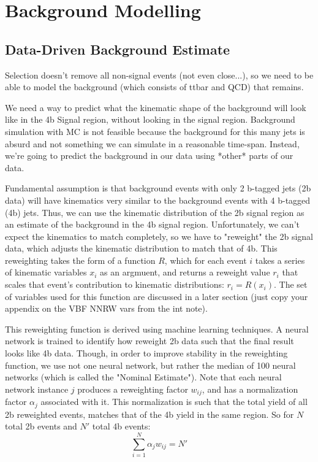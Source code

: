 \chapter{Background Modelling} \label{chapter:background}

\section{Data-Driven Background Estimate}

Selection doesn't remove all non-signal events (not even close...),
    so we need to be able to model the background (which consists of ttbar and QCD) that remains.

We need a way to predict what the kinematic shape of the background will look like in the 4b Signal region,
    without looking in the signal region.
Background simulation with MC is not feasible because the background for this many jets is absurd
    and not something we can simulate in a reasonable time-span.
Instead, we're going to predict the background in our data using *other* parts of our data.

Fundamental assumption is that background events with only 2 b-tagged jets (2b data)
    will have kinematics very similar to the background events with 4 b-tagged (4b) jets.
Thus, we can use the kinematic distribution of the 2b signal region as an estimate of the background in the 4b signal region.
Unfortunately, we can't expect the kinematics to match completely, so we have to "reweight" the 2b signal data,
    which adjusts the kinematic distribution to match that of 4b.
This reweighting takes the form of a function $R$,
    which for each event $i$ takes a series of kinematic variables $x_i$ as an argmuent,
    and returns a reweight value $r_i$ that scales that event's contribution to kinematic distributions:
    $r_i = R(x_i)$.
The set of variables used for this function are discussed in a later section
    (just copy your appendix on the VBF NNRW vars from the int note).

This reweighting function is derived using machine learning techniques.
A neural network is trained to identify how reweight 2b data such that the final result looks like 4b data.
Though, in order to improve stability in the reweighting function,
    we use not one neural network, but rather the median of 100 neural networks (which is called the "Nominal Estimate").
Note that each neural network instance $j$ produces a reweighting factor $w_{ij}$, and has a normalization factor $\alpha_j$ associated with it.
This normalization is such that the total yield of all 2b reweighted events,
    matches that of the 4b yield in the same region.
So for $N$ total 2b events and $N'$ total 4b events:
    \begin{equation}
    \sum_{i=1}^{N} \alpha_j w_{ij} = N'
    \end{equation}

